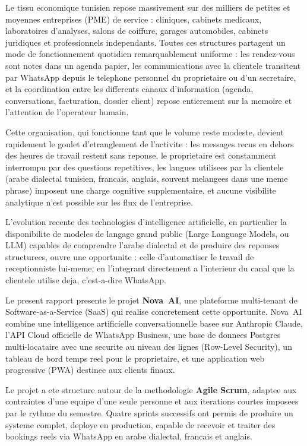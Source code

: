 Le tissu economique tunisien repose massivement sur des milliers de petites
et moyennes entreprises (PME) de service : cliniques, cabinets medicaux,
laboratoires d'analyses, salons de coiffure, garages automobiles, cabinets
juridiques et professionnels independants. Toutes ces structures partagent
un mode de fonctionnement quotidien remarquablement uniforme : les rendez-vous
sont notes dans un agenda papier, les communications avec la clientele
transitent par WhatsApp depuis le telephone personnel du proprietaire ou
d'un secretaire, et la coordination entre les differents canaux d'information
(agenda, conversations, facturation, dossier client) repose entierement sur
la memoire et l'attention de l'operateur humain.

Cette organisation, qui fonctionne tant que le volume reste modeste, devient
rapidement le goulet d'etranglement de l'activite : les messages recus en
dehors des heures de travail restent sans reponse, le proprietaire est
constamment interrompu par des questions repetitives, les langues utilisees
par la clientele (arabe dialectal tunisien, francais, anglais, souvent
melangees dans une meme phrase) imposent une charge cognitive supplementaire,
et aucune visibilite analytique n'est possible sur les flux de l'entreprise.

L'evolution recente des technologies d'intelligence artificielle, en
particulier la disponibilite de modeles de langage grand public (Large
Language Models, ou LLM) capables de comprendre l'arabe dialectal et de
produire des reponses structurees, ouvre une opportunite : celle d'automatiser
le travail de receptionniste lui-meme, en l'integrant directement a l'interieur
du canal que la clientele utilise deja, c'est-a-dire WhatsApp.

Le present rapport presente le projet \textbf{Nova~AI}, une plateforme
multi-tenant de Software-as-a-Service (SaaS) qui realise concretement cette
opportunite. Nova~AI combine une intelligence artificielle conversationnelle
basee sur Anthropic Claude, l'API Cloud officielle de WhatsApp Business, une
base de donnees Postgres multi-locataire avec une securite au niveau des
lignes (Row-Level Security), un tableau de bord temps reel pour le
proprietaire, et une application web progressive (PWA) destinee aux clients
finaux.

Le projet a ete structure autour de la methodologie \textbf{Agile Scrum},
adaptee aux contraintes d'une equipe d'une seule personne et aux iterations
courtes imposees par le rythme du semestre. Quatre sprints successifs ont
permis de produire un systeme complet, deploye en production, capable de
recevoir et traiter des bookings reels via WhatsApp en arabe dialectal,
francais et anglais.

